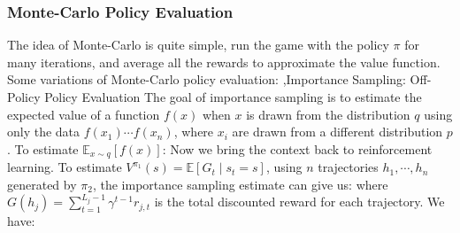 \documentclass[12pt]{report}
\begin{document}
\subsubsection{Monte-Carlo Policy Evaluation}
The idea of Monte-Carlo is quite simple, run the game with the policy $\pi$ for many iterations, and average all the rewards to approximate
the value function.
Some variations of Monte-Carlo policy evaluation:
\sep{Importance Sampling: Off-Policy Policy Evaluation}
The goal of importance sampling is to estimate the expected value of a function $f(x)$ when $x$ is drawn from the distribution $q$ using only the data $f(x_1)\cdots f(x_n)$,
where $x_i$ are drawn from a different distribution $p$. To estimate $\mathbb{E}_{x\sim q}[f(x)]$:
Now we bring the context back to reinforcement learning. To estimate $V^{\pi_1}(s)=\mathbb{E}[G_t\mid s_t=s]$,
using $n$ trajectories $h_1,\cdots,h_n$ generated by $\pi_2$, the importance sampling estimate can give us:
where $G(h_j)=\sum_{t=1}^{L_j-1}\gamma^{t-1}r_{j,t}$ is the total discounted reward for each trajectory. We have:
\end{document}

